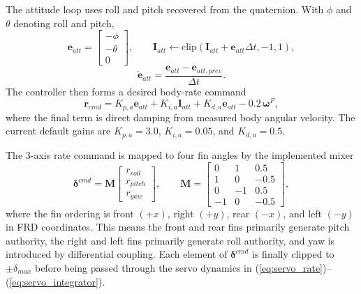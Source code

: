 \documentclass[10pt,twocolumn]{article}
\begin{document}
The attitude loop uses roll and pitch recovered from the quaternion. With $\phi$ and $\theta$ denoting roll and pitch,
\begin{equation}
\mathbf{e}_{att} =
\begin{bmatrix}
-\phi \\ -\theta \\ 0
\end{bmatrix},
\qquad
\mathbf{I}_{att} \leftarrow \mathrm{clip}(\mathbf{I}_{att} + \mathbf{e}_{att}\Delta t,-1,1),
\label{eq:pid_att_int}
\end{equation}
\begin{equation}
\dot{\mathbf{e}}_{att} =
\frac{\mathbf{e}_{att}-\mathbf{e}_{att,prev}}{\Delta t}.
\label{eq:pid_att_deriv}
\end{equation}
The controller then forms a desired body-rate command
\begin{equation}
\mathbf{r}_{cmd} =
K_{p,a}\mathbf{e}_{att}
+ K_{i,a}\mathbf{I}_{att}
+ K_{d,a}\dot{\mathbf{e}}_{att}
- 0.2\,\boldsymbol{\omega}^{F},
\label{eq:pid_rate_cmd}
\end{equation}
where the final term is direct damping from measured body angular velocity. The current default gains are $K_{p,a}=3.0$, $K_{i,a}=0.05$, and $K_{d,a}=0.5$.

The 3-axis rate command is mapped to four fin angles by the implemented mixer
\begin{equation}
\boldsymbol{\delta}^{cmd}
=
\mathbf{M}
\begin{bmatrix}
r_{roll}\\
r_{pitch}\\
r_{yaw}
\end{bmatrix},
\qquad
\mathbf{M}
=
\begin{bmatrix}
0 & 1 & 0.5 \\
1 & 0 & -0.5 \\
0 & -1 & 0.5 \\
-1 & 0 & -0.5
\end{bmatrix},
\label{eq:fin_mixer}
\end{equation}
where the fin ordering is front $(+x)$, right $(+y)$, rear $(-x)$, and left $(-y)$ in FRD coordinates. This means the front and rear fins primarily generate pitch authority, the right and left fins primarily generate roll authority, and yaw is introduced by differential coupling. Each element of $\boldsymbol{\delta}^{cmd}$ is finally clipped to $\pm \delta_{max}$ before being passed through the servo dynamics in (\ref{eq:servo_rate})--(\ref{eq:servo_integrator}).
\end{document}
